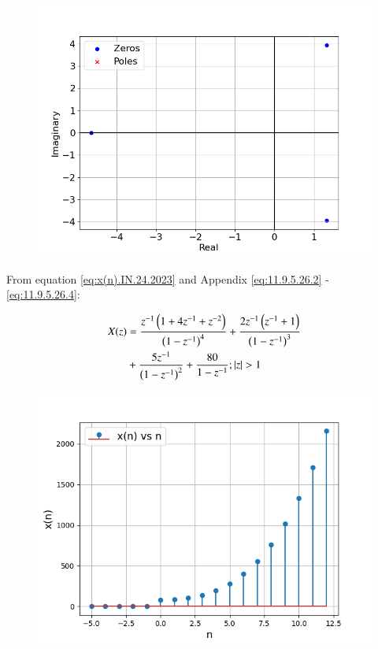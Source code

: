 \documentclass[journal,12pt,twocolumn]{IEEEtran}
\theoremstyle{remark}
\begin{document}

\begin{figure}[htbp]
    \centering
    \includegraphics[width = \columnwidth]{figs/poles and root_plot.png}
  \caption{}
    \label{fig:graph1}
\end{figure}

\noindent From equation \eqref{eq:x(n).IN.24.2023} and Appendix \eqref{eq:11.9.5.26.2} - \eqref{eq:11.9.5.26.4}:

\begin{align}
    X(z) &= \frac{z^{-1}\brak{1+4z^{-1}+z^{-2}}}{\brak{1-z^{-1}}^4} + \frac{2z^{-1}\brak{z^{-1}+1}}{\brak{1-z^{-1}}^3} \notag \\
    &+\frac{5z^{-1}}{\brak{1-z^{-1}}^2}+\dfrac{80}{1-z^{-1}} ; |z|>1
\end{align}

\begin{figure}[htbp]
    \centering
    \includegraphics[width = \columnwidth]{figs/x_n_plot.png}
  \caption{}
    \label{fig:graph1.IN.24.2023}
\end{figure}
\end{document}
